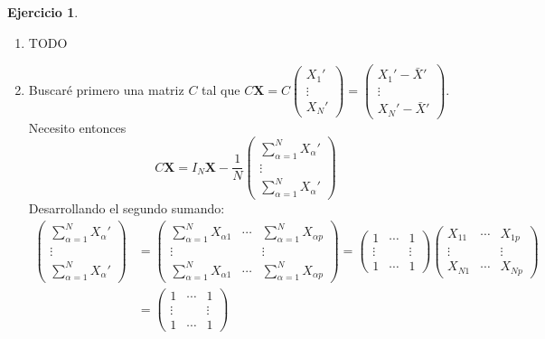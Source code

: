 \documentclass[12pt,spanish]{article}
\theoremstyle{definition}
\newtheorem{exercise}{Ejercicio}
\begin{document}
\begin{exercise} ~ %
  \begin{enumerate}[$a)$]
  \item TODO
  \item Buscaré primero una matriz $C$ tal que $C\textbf{X}=
    C\begin{pmatrix}
      X_1' \\ \vdots \\ X_N'
    \end{pmatrix}=
    \begin{pmatrix}
      X_1'-\bar{X}' \\ \vdots \\ X_N'-\bar{X}'
    \end{pmatrix}$. \\
    Necesito entonces \[C\textbf{X}=I_N\textbf{X}-\frac{1}{N}\begin{pmatrix}
      \sum_{\alpha=1}^N X_\alpha'\\ \vdots \\ \sum_{\alpha=1}^N X_\alpha'
    \end{pmatrix}
  \]
  Desarrollando el segundo sumando:
  \begin{align*}
    \begin{pmatrix}
      \sum_{\alpha=1}^N X_\alpha'\\ \vdots \\ \sum_{\alpha=1}^N X_\alpha'
    \end{pmatrix}&=
    \begin{pmatrix}
      \sum_{\alpha=1}^N X_{\alpha 1} & \cdots & \sum_{\alpha=1}^N X_{\alpha p} \\ \vdots & & \vdots \\ \sum_{\alpha=1}^N X_{\alpha 1} & \cdots & \sum_{\alpha=1}^N X_{\alpha p}
    \end{pmatrix}=
    \begin{pmatrix}
      1 & \cdots & 1 \\ \vdots & & \vdots \\ 1 & \cdots & 1
    \end{pmatrix}
    \begin{pmatrix}
      X_{11} & \cdots & X_{1p} \\ \vdots & & \vdots \\ X_{N1} & \cdots & X_{Np}
    \end{pmatrix}\\&=\begin{pmatrix}
      1 & \cdots & 1 \\ \vdots & & \vdots \\ 1 & \cdots & 1

\end{pmatrix}
\end{align*}
\end{enumerate}
\end{exercise}
\end{document}
